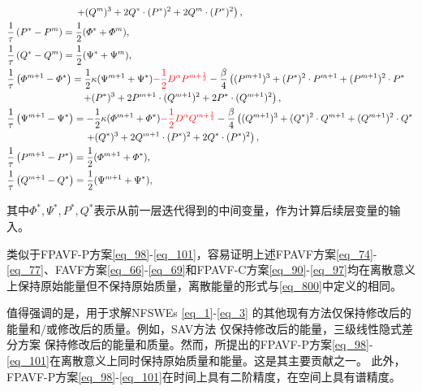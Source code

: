 \begin{enumerate}[$\bullet$]
\begin{align}
		&~~~~~~~~~~~~~~~~~~~~~\left.+ (Q^{m})^{3}+2 Q^{*}\cdot (P^{*})^{2}+2 Q^{m}\cdot (P^{*})^{2}\right),\label{eq_91}\\
&\frac{1}{\tau}\left(P^{*}-P^{m}\right)=\frac{1}{2}(\varPhi^{*}+\varPhi^{m}),\label{eq_92}\\
&\frac{1}{\tau}\left(Q^{*}-Q^{m}\right)=\frac{1}{2}(\Psi^{*}+\Psi^{m}),\label{eq_93}\\
&\frac{1}{\tau}\left(\varPhi^{m+1}-\varPhi^{*}\right)=\frac{1}{2}\kappa (\Psi^{m+1}+\Psi^{*})\textcolor[rgb]{1.00,0.00,0.00}{-\frac{1}{2}D^{\alpha} P^{m+\frac{1}{2}}}-\frac{\beta}{4}\left((P^{m+1})^3+(P^{*})^{2}\cdot P^{m+1}+(P^{m+1})^{2}\cdot P^{*}\right.\nonumber\\
		&~~~~~~~~~~~~~~~~~~~~~~~\left.+ (P^{*})^{3}+2 P^{m+1}\cdot (Q^{m+1})^{2}+2 P^{*}\cdot (Q^{m+1})^{2}\right),\label{eq_94}\\
&\frac{1}{\tau}\left(\Psi^{m+1}-\Psi^{*}\right)=-\frac{1}{2}\kappa (\varPhi^{m+1}+\varPhi^{*})\textcolor[rgb]{1.00,0.00,0.00}{-\frac{1}{2}D^{\alpha} Q^{m+\frac{1}{2}}}-\frac{\beta}{4}\left((Q^{m+1})^3+(Q^{*})^{2}\cdot Q^{m+1}+(Q^{m+1})^{2}\cdot Q^{*}\right.\nonumber\\
		&~~~~~~~~~~~~~~~~~~~~~~~~\left.+ (Q^{*})^{3}+2 Q^{m+1}\cdot (P^{*})^{2}+2 Q^{*}\cdot (P^{*})^{2}\right),\label{eq_95}\\
&\frac{1}{\tau}\left(P^{m+1}-P^{*}\right)=\frac{1}{2}(\varPhi^{m+1}+\varPhi^{*}),\label{eq_96}\\
&\frac{1}{\tau}\left(Q^{m+1}-Q^{*}\right)=\frac{1}{2}(\Psi^{m+1}+\Psi^{*}),\label{eq_97}
\end{align}
\end{enumerate}
其中$\Phi^*, \Psi^*, P^*, Q^*$表示从前一层迭代得到的中间变量，作为计算后续层变量的输入。

\begin{remark}\label{rmk1}
类似于FPAVF-P方案\eqref{eq_98}-\eqref{eq_101}，容易证明上述FPAVF方案\eqref{eq_74}-\eqref{eq_77}、FAVF方案\eqref{eq_66}-\eqref{eq_69}和FPAVF-C方案\eqref{eq_90}-\eqref{eq_97}均在离散意义上保持原始能量但不保持原始质量，离散能量的形式与\eqref{eq_800}中定义的相同。
\end{remark}

\begin{remark}\label{rmk2}
值得强调的是，用于求解NFSWEs \eqref{eq_1}-\eqref{eq_3} 的其他现有方法仅保持修改后的能量和/或修改后的质量。例如，SAV方法 
仅保持修改后的能量，三级线性隐式差分方案
保持修改后的能量和质量。然而，所提出的FPAVF-P方案\eqref{eq_98}-\eqref{eq_101}在离散意义上同时保持原始质量和能量。这是其主要贡献之一。
此外，FPAVF-P方案\eqref{eq_98}-\eqref{eq_101}在时间上具有二阶精度，在空间上具有谱精度。
\end{remark}

